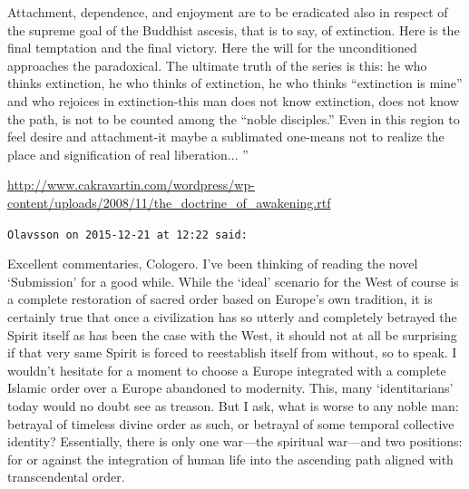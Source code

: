 \begin{footnotesize}
\begin{sffamily}
Attach\-ment, dependence, and enjoyment are to be eradicated also in respect of the supreme goal of the Buddhist ascesis, that is to say, of extinction. Here is the final temptation and the final victory. Here the will for the unconditioned approaches the paradoxical. The ultimate truth of the series is this: he who thinks extinction, he who thinks of ex\-tinction, he who thinks ``extinction is mine'' and who rejoices in extinction-this man does not know extinction, does not know the path, is not to be counted among the ``noble disciples.'' Even in this region to feel desire and attachment-it maybe a sublimated one-means not to realize the place and signification of real liberation... ''

\url{http://www.cakravartin.com/wordpress/wp-content/uploads/2008/11/the_doctrine_of_awakening.rtf}


\hfill

\texttt{Olavsson on 2015-12-21 at 12:22 said:}

Excellent commentaries, Cologero. I've been thinking of reading the novel `Submission' for a good while. While the `ideal' scenario for the West of course is a complete restoration of sacred order based on Europe's own tradition, it is certainly true that once a civilization has so utterly and completely betrayed the Spirit itself as has been the case with the West, it should not at all be surprising if that very same Spirit is forced to reestablish itself from without, so to speak. I wouldn't hesitate for a moment to choose a Europe integrated with a complete Islamic order over a Europe abandoned to modernity. This, many `identitarians' today would no doubt see as treason. But I ask, what is worse to any noble man: betrayal of timeless divine order as such, or betrayal of some temporal collective identity? Essentially, there is only one war---the spiritual war---and two positions: for or against the integration of human life into the ascending path aligned with transcendental order.


\end{sffamily}
\end{footnotesize}
